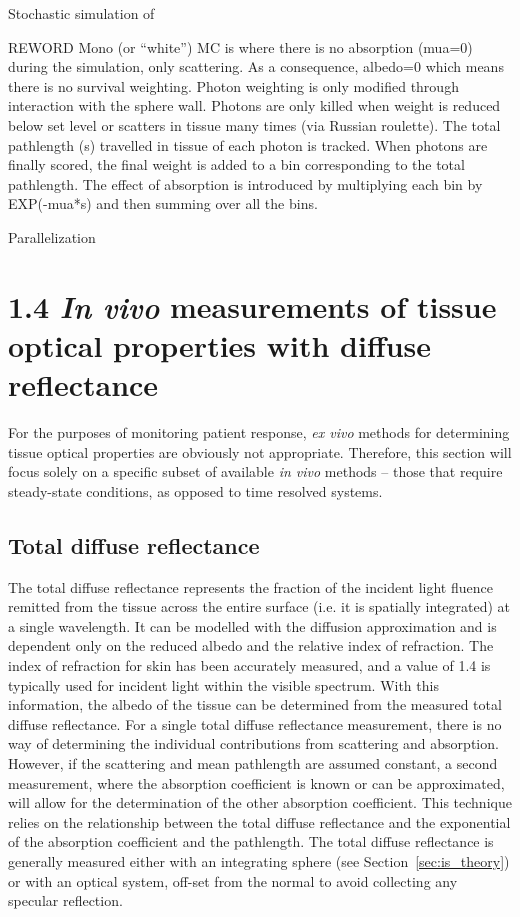 Stochastic simulation of 

REWORD Mono (or “white”) MC is where there is no absorption (mua=0) during the simulation, only scattering. As a consequence, albedo=0 which means there is no survival weighting. Photon weighting is only modified through interaction with the sphere wall. Photons are only killed when weight is reduced below set level or scatters in tissue many times (via Russian roulette). The total pathlength (s) travelled in tissue of each photon is tracked. When photons are finally scored, the final weight is added to a bin corresponding to the total pathlength. The effect of absorption is introduced by multiplying each bin by EXP(-mua*s) and then summing over all the bins.

Parallelization

\section{1.4	\emph{In vivo} measurements of tissue optical properties with diffuse reflectance}
For the purposes of monitoring patient response, \emph{ex vivo} methods for determining tissue optical properties are obviously not appropriate. Therefore, this section will focus solely on a specific subset of available \emph{in vivo} methods – those that require steady-state conditions, as opposed to time resolved systems.

\subsection{Total diffuse reflectance}
The total diffuse reflectance represents the fraction of the incident light fluence remitted from the tissue across the entire surface (i.e. it is spatially integrated) at a single wavelength. It can be modelled with the diffusion approximation and is dependent only on the reduced albedo and the relative index of refraction.\cite{Kim2011} The index of refraction for skin has been accurately measured, and a value of 1.4 is typically used for incident light within the visible spectrum.\cite{Kienle1996a} With this information, the albedo of the tissue can be determined from the measured total diffuse reflectance. For a single total diffuse reflectance measurement, there is no way of determining the individual contributions from scattering and absorption. However, if the scattering and mean pathlength are assumed constant, a second measurement, where the absorption coefficient is known or can be approximated, will allow for the determination of the other absorption coefficient. This technique relies on the relationship between the total diffuse reflectance and the exponential of the absorption coefficient and the pathlength. The total diffuse reflectance is generally measured either with an integrating sphere (see Section~\ref{sec:is_theory}) or with an optical system, off-set from the normal to avoid collecting any specular reflection.

